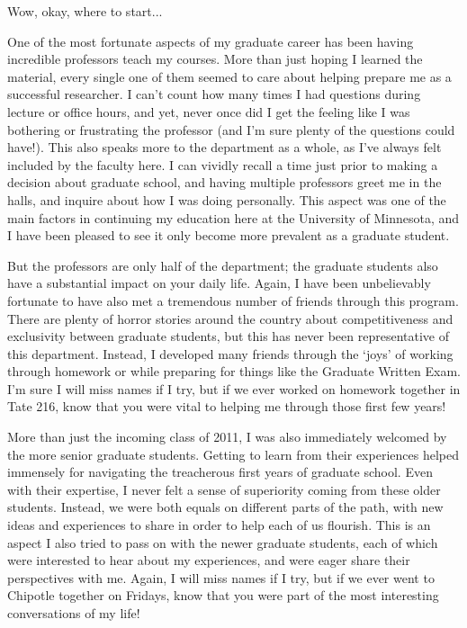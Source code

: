 Wow, okay, where to start...

One of the most fortunate aspects of my graduate career has been having incredible professors teach my courses.
More than just hoping I learned the material, every single one of them seemed to care about helping prepare me as a successful researcher.
I can't count how many times I had questions during lecture or office hours, and yet, never once did I get the feeling like I was bothering or frustrating the professor (and I'm sure plenty of the questions could have!).
This also speaks more to the department as a whole, as I've always felt included by the faculty here.
I can vividly recall a time just prior to making a decision about graduate school, and having multiple professors greet me in the halls, and inquire about how I was doing personally.
This aspect was one of the main factors in continuing my education here at the University of Minnesota, and I have been pleased to see it only become more prevalent as a graduate student.

But the professors are only half of the department; the graduate students also have a substantial impact on your daily life.
Again, I have been unbelievably fortunate to have also met a tremendous number of friends through this program.
There are plenty of horror stories around the country about competitiveness and exclusivity between graduate students, but this has never been representative of this department.
Instead, I developed many friends through the `joys' of working through homework or while preparing for things like the Graduate Written Exam.
I'm sure I will miss names if I try, but if we ever worked on homework together in Tate 216, know that you were vital to helping me through those first few years!

More than just the incoming class of 2011, I was also immediately welcomed by the more senior graduate students.
Getting to learn from their experiences helped immensely for navigating the treacherous first years of graduate school.
Even with their expertise, I never felt a sense of superiority coming from these older students.
Instead, we were both equals on different parts of the path, with new ideas and experiences to share in order to help each of us flourish.
This is an aspect I also tried to pass on with the newer graduate students, each of which were interested to hear about my experiences, and were eager share their perspectives with me.
Again, I will miss names if I try, but if we ever went to Chipotle together on Fridays, know that you were part of the most interesting conversations of my life! 

